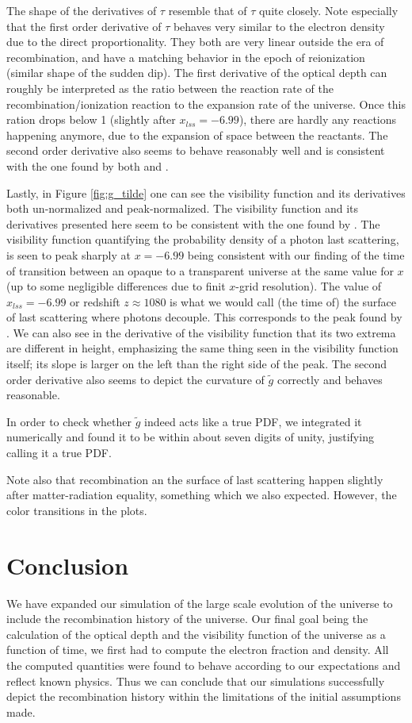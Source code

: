 \documentclass[twocolumn]{aastex62}
\begin{document}
The shape of the derivatives of $\tau$ resemble that of $\tau$ quite closely. Note especially that the first order derivative of $\tau$ behaves very similar to the electron density due to the direct proportionality. They both are very linear outside the era of recombination, and have a matching behavior in the epoch of reionization (similar shape of the sudden dip). The first derivative of the optical depth can roughly be interpreted as the ratio between the reaction rate of the recombination/ionization reaction to the expansion rate of the universe. Once this ration drops below 1 (slightly after $x_{lss} = -6.99$), there are hardly any reactions happening anymore, due to the expansion of space between the reactants. The second order derivative also seems to behave reasonably well and is consistent with the one found by both \cite{callin:2006} and \cite{winther:2020}.  

Lastly, in Figure \ref{fig:g_tilde} one can see the visibility function and its derivatives both un-normalized and peak-normalized. The visibility function and its derivatives presented here seem to be consistent with the one found by \cite{callin:2006}. The visibility function quantifying the probability density of a photon last scattering, is seen to peak sharply at $x = -6.99$ being consistent with our finding of the time of transition between an opaque to a transparent universe at the same value for $x$ (up to some negligible differences due to finit $x$-grid resolution). The value of $x_{lss} = -6.99$ or redshift $z \approx 1080$ is what we would call (the time of) the surface of last scattering where photons decouple. This corresponds to the peak found by \cite{callin:2006}. We can also see in the derivative of the visibility function that its two extrema are different in height, emphasizing the same thing seen in the visibility function itself; its slope is larger on the left than the right side of the peak. The second order derivative also seems to depict the curvature of $\tilde{g}$ correctly and behaves reasonable. 

In order to check whether $\tilde{g}$ indeed acts like a true PDF, we integrated it numerically and found it to be within about seven digits of unity, justifying calling it a true PDF.

Note also that recombination an the surface of last scattering happen slightly after matter-radiation equality, something which we also expected. However, the color transitions in the plots.

\section{Conclusion} \label{sec:Conclusion}
We have expanded our simulation of the large scale evolution of the universe to include the recombination history of the universe. Our final goal being the calculation of the optical depth and the visibility function of the universe as a function of time, we first had to compute the electron fraction and density. All the computed quantities were found to behave according to our expectations and reflect known physics. Thus we can conclude that our simulations successfully depict the recombination history within the limitations of the initial assumptions made.
\newpage


\end{document}
